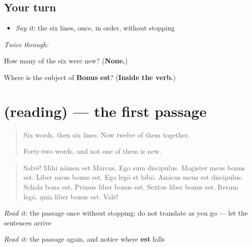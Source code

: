 \subsection*{Your turn}
\begin{itemize}
\raggedright
  \item \emph{Say it:} the six lines, once, in order, without stopping
\end{itemize}

\emph{Twice through:}

\begin{tcolorbox}[breakable,colback=teal!4,colframe=teal!35!black,title={Before you move on}]
How many of the six were new? (\textbf{None.})

Where is the subject of \textbf{Bonus est}? (\textbf{Inside the verb.})
\end{tcolorbox}
\section[(reading)]{(reading) — the first passage}

\label{lesson:LA-C58-prima-lectio}



\begin{quote}
Six words, then six lines. Now twelve of them together.

Forty-two words, and not one of them is new.
\end{quote}

\begin{tcolorbox}[breakable,skin=enhanced,colback=orange!6,colframe=orange!45!black,boxrule=0.5pt,arc=1mm,left=6pt,right=6pt,top=4pt,bottom=4pt,fonttitle=\bfseries,title={Read this}]
\begin{quote}
Salvē! Mihi nōmen est Mārcus. Ego sum discipulus. Magister meus bonus est. Liber meus bonus est. Ego legō et bibō. Amīcus meus est discipulus. Schola bona est. Prīmus liber bonus est. Sextus liber bonus est. Iterum legō, quia liber bonus est. Valē!
\end{quote}

\emph{Read it:} the passage once without stopping; do not translate as you go — let the sentences arrive

\emph{Read it:} the passage again, and notice where \textbf{est} falls
\end{tcolorbox}

